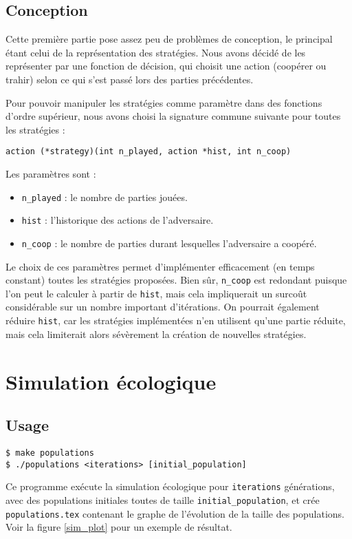 \documentclass[10pt]{article}
\begin{document}
\subsection{Conception}
Cette première partie pose assez peu de problèmes de conception,
le principal étant celui de la représentation des stratégies.
Nous avons décidé de les représenter par une fonction de décision, qui choisit une action
(coopérer ou trahir) selon ce qui s'est passé lors des parties précédentes.

Pour pouvoir manipuler les stratégies comme paramètre dans des fonctions d'ordre supérieur, 
nous avons choisi la signature commune suivante pour toutes les stratégies :
\begin{verbatim}
action (*strategy)(int n_played, action *hist, int n_coop)
\end{verbatim}

Les paramètres sont :
\begin{itemize}
\item \verb|n_played| : le nombre de parties jouées.
\item \verb|hist| : l'historique des actions de l'adversaire.
\item \verb|n_coop| : le nombre de parties durant lesquelles l'adversaire a coopéré.
\end{itemize}
Le choix de ces paramètres permet d'implémenter efficacement (en temps constant)
toutes les stratégies proposées. Bien sûr, \verb|n_coop| est redondant puisque
l'on peut le calculer à partir de \verb|hist|, mais cela impliquerait un surcoût
considérable sur un nombre important d'itérations.
On pourrait également réduire \verb|hist|, car les stratégies implémentées n'en
utilisent qu'une partie réduite, mais cela limiterait alors sévèrement la
création de nouvelles stratégies.


\section{Simulation écologique}
\subsection{Usage}
\begin{verbatim}
$ make populations
$ ./populations <iterations> [initial_population]
\end{verbatim}

Ce programme exécute la simulation écologique pour \verb|iterations| générations,
avec des populations initiales toutes de taille \verb|initial_population|,
et crée \verb|populations.tex| contenant le graphe de l'évolution de la taille des populations.
Voir la figure \ref{sim_plot} pour un exemple de résultat.
\end{document}
